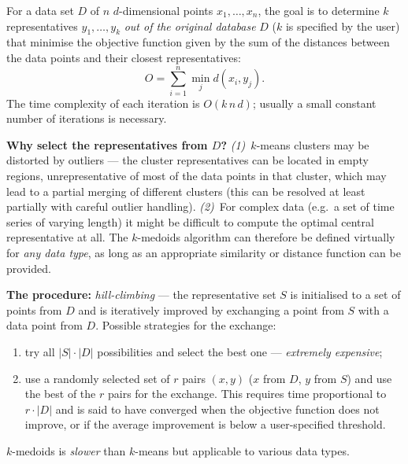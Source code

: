 \documentclass[11pt,a4paper]{article}
\theoremstyle{definition}
\begin{document}
\begin{defbox}
For a data set $D$ of $n$ $d$-dimensional points $x_1,\dots,x_n$, the goal is to determine $k$
representatives $y_1,\dots,y_k$ \emph{out of the original database} $D$ ($k$ is specified by the
user) that minimise the objective function given by the sum of the distances between the data
points and their closest representatives:
\[ O=\sum_{i=1}^{n}\min_{j} d(x_i,y_j). \]
The time complexity of each iteration is $O(k\,n\,d)$; usually a small constant number of
iterations is necessary.

\textbf{Why select the representatives from $D$?} \emph{(1)}~$k$-means clusters may be distorted by
outliers --- the cluster representatives can be located in empty regions, unrepresentative of most
of the data points in that cluster, which may lead to a partial merging of different clusters
(this can be resolved at least partially with careful outlier handling). \emph{(2)}~For complex
data (e.g.\ a set of time series of varying length) it might be difficult to compute the optimal
central representative at all. The $k$-medoids algorithm can therefore be defined virtually for
\emph{any data type}, as long as an appropriate similarity or distance function can be provided.

\textbf{The procedure:} \emph{hill-climbing} --- the representative set $S$ is initialised to a
set of points from $D$ and is iteratively improved by exchanging a point from $S$ with a data point
from $D$. Possible strategies for the exchange:
\begin{enumerate}
\item try all $|S|\cdot|D|$ possibilities and select the best one --- \emph{extremely expensive};
\item use a randomly selected set of $r$ pairs $(x,y)$ ($x$ from $D$, $y$ from $S$) and use the
      best of the $r$ pairs for the exchange. This requires time proportional to $r\cdot|D|$ and is
      said to have converged when the objective function does not improve, or if the average
      improvement is below a user-specified threshold.
\end{enumerate}
$k$-medoids is \emph{slower} than $k$-means but applicable to various data types.
\end{defbox}
\end{document}
